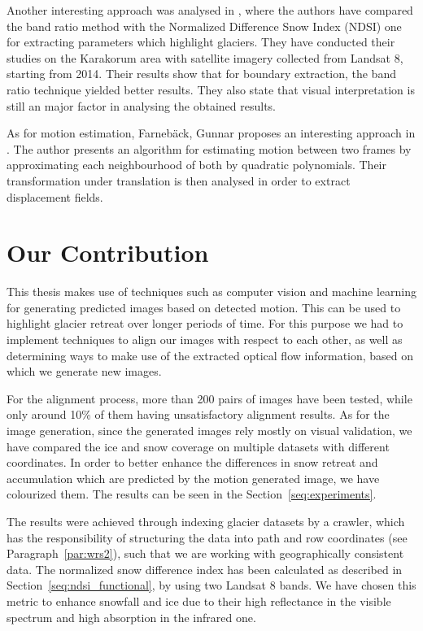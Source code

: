 \documentclass[12pt, a4paper]{report}
\begin{document}
	\par Another interesting approach was analysed in \cite{WANG2017}, where the authors have compared the band ratio method with the Normalized Difference Snow Index (NDSI) one for extracting parameters which highlight glaciers. They have conducted their studies on the Karakorum area with satellite imagery collected from Landsat 8, starting from 2014. Their results show that for boundary extraction, the band ratio technique yielded better results. They also state that visual interpretation is still an major factor in analysing the obtained results.
	
	\par As for motion estimation, Farneb{\"a}ck, Gunnar proposes an interesting approach in \cite{GUNNAR2003}. The author presents an algorithm for estimating motion between two frames by approximating each neighbourhood of both by quadratic polynomials. Their transformation under translation is then analysed in order to extract displacement fields.

	\section{Our Contribution}
	
	\par This thesis makes use of techniques such as computer vision and machine learning for generating predicted images based on detected motion. This can be used to highlight glacier retreat over longer periods of time. For this purpose we had to implement techniques to align our images with respect to each other, as well as determining ways to make use of the extracted optical flow information, based on which we generate new images.

	\par For the alignment process, more than 200 pairs of images have been tested, while only around 10\% of them having unsatisfactory alignment results. As for the image generation, since the generated images rely mostly on visual validation, we have compared the ice and snow coverage on multiple datasets with different coordinates. In order to better enhance the differences in snow retreat and accumulation which are predicted by the motion generated image, we have colourized them. The results can be seen in the Section~\ref{seq:experiments}. 
	
	\par The results were achieved through indexing glacier datasets by a crawler, which has the responsibility of structuring the data into path and row coordinates (see Paragraph~\ref{par:wrs2}), such that we are working with geographically consistent data. The normalized snow difference index has been calculated as described in Section~\ref{seq:ndsi_functional}, by using two Landsat 8 bands. We have chosen this metric to enhance snowfall and ice due to their high reflectance in the visible spectrum and high absorption in the infrared one.
	
\end{document}
